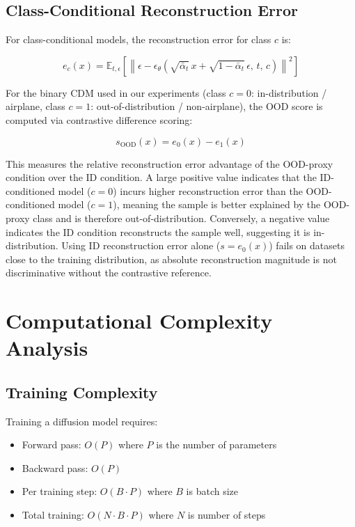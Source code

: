 \subsection{Class-Conditional Reconstruction Error}
\label{app:math-derivations:reconstruction:class}

For class-conditional models, the reconstruction error for class $c$ is:

\begin{equation}
\label{eq:appB:class-error}
e_c(x) = \mathbb{E}_{t,\epsilon} \left[ \left\| \epsilon - \epsilon_\theta\!\left( \sqrt{\bar{\alpha}_t}\, x + \sqrt{1 - \bar{\alpha}_t}\, \epsilon,\, t,\, c \right) \right\|^2 \right]
\end{equation}

For the binary CDM used in our experiments (class $c = 0$: in-distribution / airplane, class $c = 1$: out-of-distribution / non-airplane), the OOD score is computed via contrastive difference scoring:

\begin{equation}
\label{eq:appB:ood-score}
s_{\text{OOD}}(x) = e_0(x) - e_1(x)
\end{equation}

This measures the relative reconstruction error advantage of the OOD-proxy condition over the ID condition. A large positive value indicates that the ID-conditioned model ($c = 0$) incurs higher reconstruction error than the OOD-conditioned model ($c = 1$), meaning the sample is better explained by the OOD-proxy class and is therefore out-of-distribution. Conversely, a negative value indicates the ID condition reconstructs the sample well, suggesting it is in-distribution. Using ID reconstruction error alone ($s = e_0(x)$) fails on datasets close to the training distribution, as absolute reconstruction magnitude is not discriminative without the contrastive reference.


\section{Computational Complexity Analysis}
\label{app:math-derivations:complexity}

\subsection{Training Complexity}
\label{app:math-derivations:complexity:training}

Training a diffusion model requires:
\begin{itemize}
  \item Forward pass: $O(P)$ where $P$ is the number of parameters
  \item Backward pass: $O(P)$
  \item Per training step: $O(B \cdot P)$ where $B$ is batch size
  \item Total training: $O(N \cdot B \cdot P)$ where $N$ is number of steps
\end{itemize}

